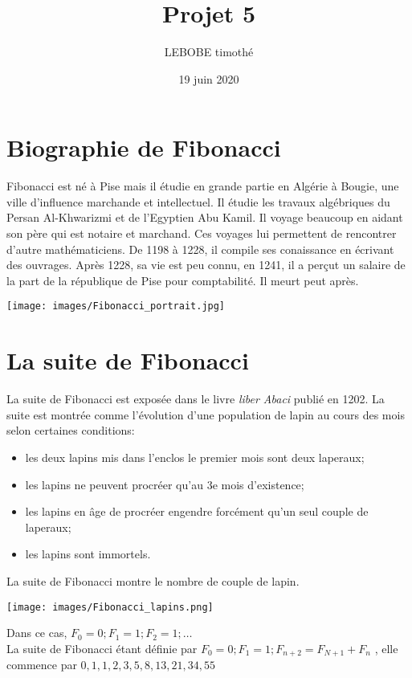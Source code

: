 \documentclass{article}
\title{Projet 5}
\author{LEBOBE timothé}
\date{19 juin 2020}
\begin{document}
    \maketitle
    \newpage

    \tableofcontents
    \newpage

    \section{Biographie de Fibonacci}
        Fibonacci est né à Pise mais il étudie en grande partie en Algérie à Bougie, une ville d'influence marchande et intellectuel.
        Il étudie les travaux algébriques du Persan Al-Khwarizmi et de l'Egyptien Abu Kamil. Il voyage beaucoup en aidant son père qui est
        notaire et marchand. Ces voyages lui permettent de rencontrer d'autre mathématiciens. De 1198 à 1228, il compile ses conaissance 
        en écrivant des ouvrages. Après 1228, sa vie est peu connu, en 1241, il a perçut un salaire de la part de la république de Pise
        pour comptabilité. Il meurt peut après.
        \begin{center}
            \texttt{[image: images/Fibonacci\_portrait.jpg]}
        \end{center}

        \newpage

    \section{La suite de Fibonacci}
        La suite de Fibonacci est exposée dans le livre \textit{liber Abaci} publié en 1202. La suite est montrée comme l'évolution
        d'une population de lapin au cours des mois selon certaines conditions:
        \begin{itemize}
            \item les deux lapins mis dans l'enclos le premier mois sont deux laperaux;
            \item les lapins ne peuvent procréer qu'au 3e mois d'existence;
            \item les lapins en âge de procréer engendre forcément qu'un seul couple de laperaux;
            \item les lapins sont immortels.
        \end{itemize}
        La suite de Fibonacci montre le nombre de couple de lapin.
        \begin{center}
            \texttt{[image: images/Fibonacci\_lapins.png]}
        \end{center}
        Dans ce cas, $F_0 = 0; F_1 = 1; F_2 = 1 ;\dots$ \\
        La suite de Fibonacci étant définie par $F_0 = 0; F_1 = 1; F_{n+2} = F_{N+1} + F_n $
        , elle commence par $0, 1, 1, 2, 3, 5, 8, 13, 21, 34, 55$
\end{document}
